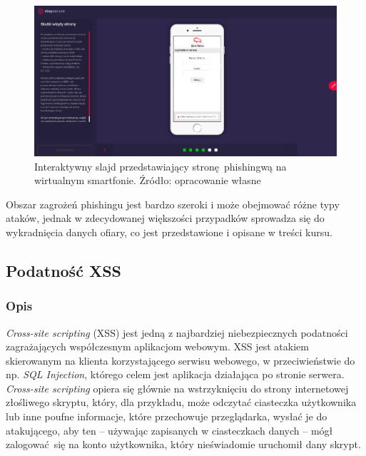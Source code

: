 \documentclass[12pt,twoside]{article}
\begin{document}
\begin{figure}[H]
	\centering
	\includegraphics[width=1\linewidth]{figures/phishing-slide-screenshot2.png}
	\caption{Interaktywny slajd przedstawiający stronę phishingwą na wirtualnym smartfonie. Źródło: opracowanie własne}
	\label{fig:phishing-organisations}
\end{figure}

Obszar zagrożeń phishingu jest bardzo szeroki i może obejmować różne typy ataków, jednak w zdecydowanej większości przypadków sprowadza się do wykradnięcia danych ofiary, co jest przedstawione i opisane w treści kursu.

\clearpage

\subsection{Podatność XSS}
\subsubsection{Opis}

\emph{Cross-site scripting} (XSS) jest jedną z najbardziej niebezpiecznych podatności zagrażających współczesnym aplikacjom webowym. XSS jest atakiem skierowanym na klienta korzystającego serwisu webowego, w przeciwieństwie do np. \emph{SQL Injection}, którego celem jest aplikacja działająca po stronie serwera. \emph{Cross-site scripting} opiera się głównie na wstrzyknięciu do strony internetowej złośliwego skryptu, który, dla przykładu, może odczytać ciasteczka użytkownika lub inne poufne informacje, które przechowuje przeglądarka, wysłać je do atakującego, aby ten -- używając zapisanych w ciasteczkach danych -- mógł zalogować się na konto użytkownika, który nieświadomie uruchomił dany skrypt. %
\end{document}
